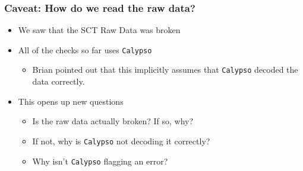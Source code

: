 \begin{frame}[fragile]
    \frametitle{Caveat: How do we read the raw data?}

    \begin{itemize}
        \item We saw that the SCT Raw Data was broken
        \item All of the checks so far uses \texttt{Calypso}
              \begin{itemize}
                  \item Brian pointed out that this implicitly assumes that \texttt{Calypso} decoded the data correctly.
              \end{itemize}
        \item This opens up new questions
              \begin{itemize}
                  \item Is the raw data actually broken? If so, why?
                  \item If not, why is \texttt{Calypso} not decoding it correctly?
                  \item Why isn't \texttt{Calypso} flagging an error?
              \end{itemize}
    \end{itemize}
\end{frame}

